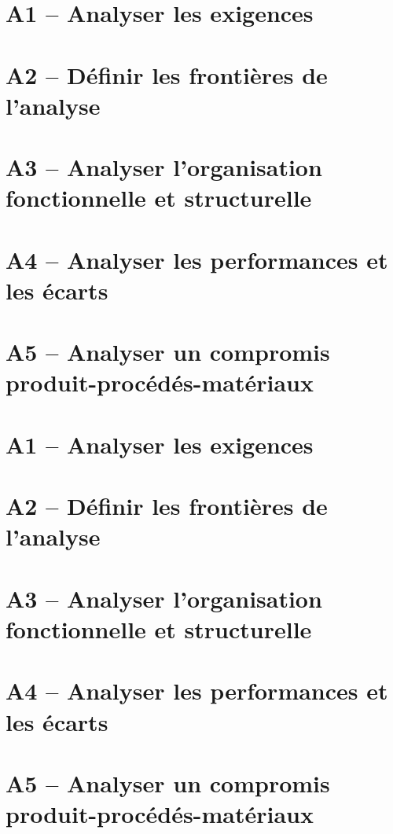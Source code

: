 \proffalse
\section{A1 -- Analyser les exigences}
\begin{multicols}{2}
\end{multicols}

\section{A2 -- Définir les frontières de l'analyse}
\begin{multicols}{2}
\end{multicols}

\section{A3 -- Analyser l'organisation fonctionnelle et structurelle}

\begin{multicols}{2}

\end{multicols}

\begin{multicols}{2}

\end{multicols}

\section{A4 -- Analyser les performances et les écarts}
\begin{multicols}{2}
\end{multicols}

\section{A5 -- Analyser un compromis produit-procédés-matériaux}
\begin{multicols}{2}
\end{multicols}


\proftrue
\newpage
\section{A1 -- Analyser les exigences}

\section{A2 -- Définir les frontières de l'analyse}

\section{A3 -- Analyser l'organisation fonctionnelle et structurelle}


\section{A4 -- Analyser les performances et les écarts}

\section{A5 -- Analyser un compromis produit-procédés-matériaux}

